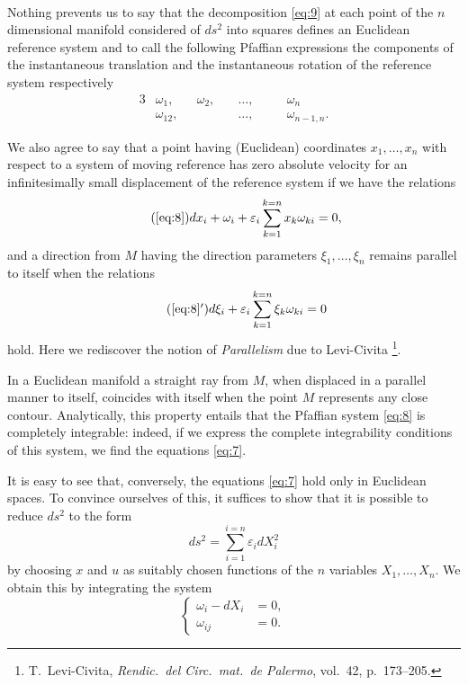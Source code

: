\documentclass[leqno,12pt]{article}
\makeatletter
\let\old@epsilon\epsilon
\let\old@varepsilon\varepsilon
\let\epsilon\old@varepsilon
\let\varepsilon\old@epsilon
\theoremstyle{shape1}
\theoremstyle{shape0}
\theoremstyle{shape2}
\theoremstyle{definition}
\makeatother
\begin{document}
\paragraph{}
\label{sec:6}
Nothing prevents us to say that the decomposition \eqref{eq:9} at each point of the $n$ dimensional manifold considered of $ds^{2}$ into squares defines an Euclidean reference system and to call the following Pfaffian expressions the components of the instantaneous translation and the instantaneous rotation of the reference system respectively
\begin{alignat*}{3}
  &\omega_{1},\quad&\omega_{2},\quad&\dots,\quad&&\omega_{n}\\
  &\omega_{12},&&\dots,&&\omega_{n-1,n}.
\end{alignat*}

We also agree to say that a point having (Euclidean) coordinates $x_{1},\dots,x_{n}$ with respect to a system of moving reference has zero absolute velocity for an infinitesimally small displacement of the reference system if we have the relations
\begin{equation}
  \label{eq:8a}\tag{\ref{eq:8}}
  dx_{i}+\omega_{i}+\epsilon_{i}\sum_{k=1}^{k=n}x_{k}\omega_{ki}=0,
\end{equation}
and a direction from $M$ having the direction parameters $\xi_{1},\dots,\xi_{n}$ remains parallel to itself when the relations
\begin{equation}
  \label{eq:8'}\tag{\ref{eq:8}$'$}
  d\xi_{i}+\epsilon_{i}\sum_{k=1}^{k=n}\xi_{k}\omega_{ki}=0
\end{equation}
hold. Here we rediscover the notion of \emph{Parallelism} due to Levi-Civita \footnote{T.~Levi-Civita, \emph{Rendic.\ del Circ.\ mat.\ de Palermo}, vol.\ 42, p.\ 173--205.}.

In a Euclidean manifold a straight ray from $M$, when displaced in a parallel manner to itself, coincides with itself when the point $M$ represents any close contour. Analytically, this property entails that the Pfaffian system \eqref{eq:8} is completely integrable: indeed, if we express the complete integrability conditions of this system, we find the equations \eqref{eq:7}.

It is easy to see that, conversely, the equations \eqref{eq:7} hold only in Euclidean spaces. To convince ourselves of this, it suffices to show that it is possible to reduce $ds^{2}$ to the form
\[
ds^{2}=\sum_{i=1}^{i=n}\epsilon_{i}dX_{i}^{2}
\]
by choosing $x$ and $u$ as suitably chosen functions of the $n$ variables $X_{1},\dots,X_{n}$. We obtain this by integrating the system
\begin{equation}
  \label{eq:11}
  \left\{
    \begin{aligned}
      \omega_{i}-dX_{i}&=0,\\
      \omega_{ij}&=0.
    \end{aligned}
  \right.
\end{equation}
\end{document}
